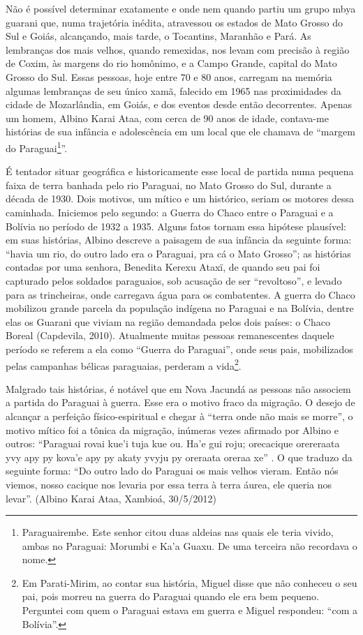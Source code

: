 Não é possível determinar exatamente e onde nem quando partiu um grupo
mbya guarani que, numa trajetória inédita, atravessou os estados de
Mato Grosso do Sul e Goiás, alcançando, mais tarde, o Tocantins,
Maranhão e Pará. As lembranças dos mais velhos, quando remexidas, nos
levam com precisão à região de Coxim, às margens do rio homônimo, e a
Campo Grande, capital do Mato Grosso do Sul. Essas pessoas, hoje entre
70 e 80 anos, carregam na memória algumas lembranças de seu único xamã,
falecido em 1965 nas proximidades da cidade de Mozarlândia, em Goiás, e
dos eventos desde então decorrentes. Apenas um homem, Albino Karai
Ataa, com cerca de 90 anos de idade, contava-me histórias de sua
infância e adolescência em um local que ele chamava de ``margem do
Paraguai\footnote{Paraguairembe. Este senhor citou duas aldeias nas
quais ele teria vivido, ambas no Paraguai: Morumbi e Ka’a Guaxu. De uma
terceira não recordava o nome.}''. 

É tentador situar geográfica e historicamente esse local de partida numa
pequena faixa de terra banhada pelo rio Paraguai, no Mato Grosso do
Sul, durante a década de 1930. Dois motivos, um mítico e um histórico,
seriam os motores dessa caminhada. Iniciemos pelo segundo: a Guerra do
Chaco entre o Paraguai e a Bolívia no período de 1932 a 1935. Alguns
fatos tornam essa hipótese plausível: em suas histórias, Albino
descreve a paisagem de sua infância da seguinte forma: ``havia um rio,
do outro lado era o Paraguai, pra cá o Mato Grosso''; as histórias
contadas por uma senhora, Benedita Kerexu Ataxï, de quando seu pai foi
capturado pelos soldados paraguaios, sob acusação de ser ``revoltoso'', e
levado para as trincheiras, onde carregava água para os combatentes. A
guerra do Chaco mobilizou grande parcela da população indígena no
Paraguai e na Bolívia, dentre elas os Guarani que viviam na região
demandada pelos dois países: o Chaco Boreal (Capdevila, 2010).
Atualmente muitas pessoas remanescentes daquele período se referem a
ela como ``Guerra do Paraguai'', onde seus pais, mobilizados pelas
campanhas bélicas paraguaias, perderam a vida\footnote{Em Parati-Mirim,
ao contar sua história, Miguel disse que não conheceu o seu pai, pois
morreu na guerra do Paraguai quando ele era bem pequeno. Perguntei com
quem o Paraguai estava em guerra e Miguel respondeu: ``com a Bolívia''.}.

Malgrado tais histórias, é notável que em Nova Jacundá as pessoas não
associem a partida do Paraguai à guerra. Esse era o motivo fraco da
migração. O desejo de alcançar a perfeição físico-espiritual e chegar à
``terra onde não mais se morre'', o motivo mítico foi a tônica da
migração, inúmeras vezes afirmado por Albino e outros: ``Paraguai rovai
kue’i tuja kue ou. Ha’e gui roju; orecacique orereraata yvy apy py
kova’e apy py akaty yvyju py oreraata oreraa xe'' . O que traduzo da
seguinte forma: ``Do outro lado do Paraguai os mais velhos vieram. Então
nós viemos, nosso cacique nos levaria por essa terra à terra áurea, ele
queria nos levar''. (Albino Karai Ataa,  Xambioá, 30/5/2012)

